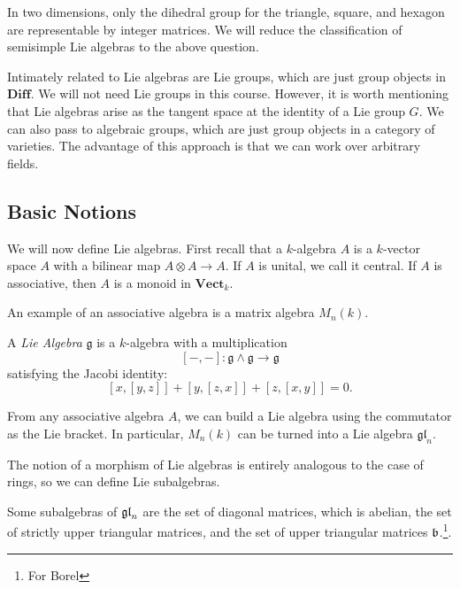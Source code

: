 \documentclass[twoside, 10pt]{article}
\begin{document}
    In two dimensions, only the dihedral group for the triangle, square, and hexagon are representable by integer matrices. We will reduce the classification of semisimple Lie algebras to the above question.

    Intimately related to Lie algebras are Lie groups, which are just group objects in $\mathbf{Diff}$. We will not need Lie groups in this course. However, it is worth mentioning that Lie algebras arise as the tangent space at the identity of a Lie group $G$. We can also pass to algebraic groups, which are just group objects in a category of varieties. The advantage of this approach is that we can work over arbitrary fields.

    \subsection{Basic Notions}%
    \label{sub:basic_notions}
    
    
    We will now define Lie algebras. First recall that a $k$-algebra $A$ is a $k$-vector space $A$ with a bilinear map $A \otimes A \to A$. If $A$ is unital, we call it central. If $A$ is associative, then $A$ is a monoid in $\mathbf{Vect}_k$.

    \begin{exm}
        An example of an associative algebra is a matrix algebra $M_n(k)$.
    \end{exm}

    \begin{defn}
        A \textit{Lie Algebra} $\mathfrak{g}$ is a $k$-algebra with a multiplication 
        \[ [-,-]: \mathfrak{g} \wedge \mathfrak{g} \to \mathfrak{g} \] 
        satisfying the Jacobi identity:
        \[ [x,[y,z]] + [y,[z,x]] + [z,[x,y]] = 0. \]
    \end{defn}

    \begin{exm}
        From any associative algebra $A$, we can build a Lie algebra using the commutator as the Lie bracket. In particular, $M_n(k)$ can be turned into a Lie algebra $\mathfrak{gl}_n$.
    \end{exm}

    The notion of a morphism of Lie algebras is entirely analogous to the case of rings, so we can define Lie subalgebras.

    \begin{exm}
        Some subalgebras of $\mathfrak{gl}_n$ are the set of diagonal matrices, which is abelian, the set of strictly upper triangular matrices, and the set of upper triangular matrices $\mathfrak{b}$.\footnote{For Borel}.
    \end{exm}
\end{document}
